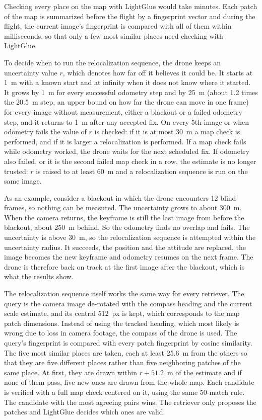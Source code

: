 \documentclass[english, Lau, oneside]{sapthesis}%
\begin{document}
Checking every place on the map with LightGlue \citep{lindenberger2023lightglue} would take minutes. Each patch of the map is summarized before the flight by a fingerprint vector and during the flight, the current image's fingerprint is compared with all of them within milliseconds, so that only a few most similar places need checking with LightGlue.

To decide when to run the relocalization sequence, the drone keeps an uncertainty value $r$, which denotes how far off it believes it could be. It starts at 1~m with a known start and at infinity when it does not know where it started. It grows by 1~m for every successful odometry step and by 25~m (about 1.2 times the 20.5~m step, an upper bound on how far the drone can move in one frame) for every image without measurement, either a blackout or a failed odometry step, and it returns to 1~m after any accepted fix. On every 5th image or when odometry fails the value of $r$ is checked: if it is at most 30~m a map check is performed, and if it is larger a relocalization is performed. If a map check fails while odometry worked, the drone waits for the next scheduled fix. If odometry also failed, or it is the second failed map check in a row, the estimate is no longer trusted: $r$ is raised to at least 60~m and a relocalization sequence is run on the same image.

As an example, consider a blackout in which the drone encounters 12 blind frames, so nothing can be measured. The uncertainty grows to about 300~m. When the camera returns, the keyframe is still the last image from before the blackout, about 250~m behind. So the odometry finds no overlap and fails. The uncertainty is above 30~m, so the relocalization sequence is attempted within the uncertainty radius. It succeeds, the position and the attitude are replaced, the image becomes the new keyframe and odometry resumes on the next frame. The drone is therefore back on track at the first image after the blackout, which is what the results show.

The relocalization sequence itself works the same way for every retriever. The query is the camera image de-rotated with the compass heading and the current scale estimate, and its central 512~px is kept, which corresponds to the map patch dimensions. Instead of using the tracked heading, which most likely is wrong due to loss in camera footage, the compass of the drone is used. The query's fingerprint is compared with every patch fingerprint by cosine similarity. The five most similar places are taken, each at least 25.6~m from the others so that they are five different places rather than five neighboring patches of the same place. At first, they are drawn within $r + 51.2$~m of the estimate and if none of them pass, five new ones are drawn from the whole map. Each candidate is verified with a full map check centered on it, using the same 50-match rule. The candidate with the most agreeing pairs wins. The retriever only proposes the patches and LightGlue decides which ones are valid.
\end{document}
